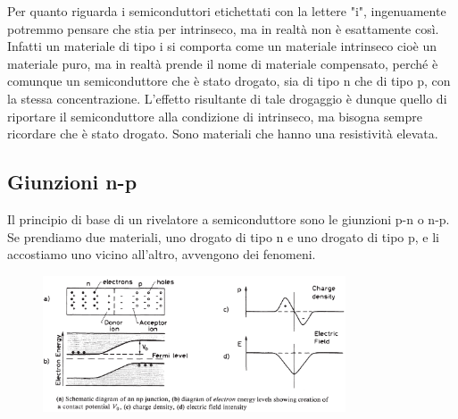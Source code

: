Per quanto riguarda i semiconduttori etichettati con la lettere "i", ingenuamente potremmo pensare che stia per intrinseco, ma in realtà non è esattamente così. Infatti un materiale di tipo i si comporta come un materiale intrinseco cioè un materiale puro, ma in realtà prende il nome di materiale compensato, perché è comunque un semiconduttore che è stato drogato, sia di tipo n che di tipo p, con la stessa concentrazione. L'effetto risultante di tale drogaggio è dunque quello di riportare il semiconduttore alla condizione di intrinseco, ma bisogna sempre ricordare che è stato drogato. Sono materiali che hanno una resistività elevata.

\subsection{Giunzioni n-p}
Il principio di base di un rivelatore a semiconduttore sono le giunzioni p-n o n-p. Se prendiamo due materiali, uno drogato di tipo n e uno drogato di tipo p, e li accostiamo uno vicino all'altro, avvengono dei fenomeni. 
\begin{figure}[H]
   \centering
   \includegraphics[width=0.8\textwidth]{immagini/giunzione_p-n.png}
\end{figure}
